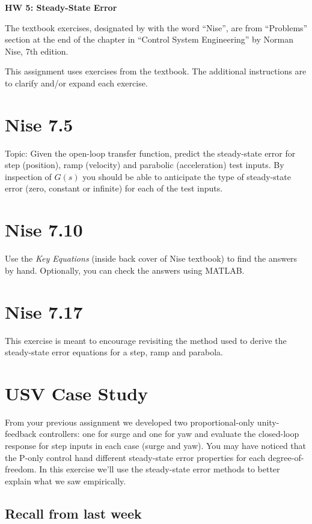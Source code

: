 \documentclass[11pt]{article}
\begin{document}
\begin{center}
  \Large{\bf{HW 5: Steady-State Error}}
\end{center}

The textbook exercises, designated by with the word “Nise”, are from “Problems” section at the end of the chapter in “Control System Engineering” by Norman Nise, 7th edition.

This assignment uses exercises from the textbook.  The additional instructions are to clarify and/or expand each exercise.

\section*{Nise 7.5}
Topic: Given the open-loop transfer function, predict the steady-state error for step (position), ramp (velocity) and parabolic (acceleration) test inputs.  By inspection of $G(s)$ you should be able to anticipate the type of steady-state error (zero, constant or infinite) for each of the test inputs.

\section*{Nise 7.10}

Use the \emph{Key Equations} (inside back cover of Nise textbook) to find the answers by hand. Optionally, you can check the answers using MATLAB.

\section*{Nise 7.17}
This exercise is meant to encourage revisiting the method used to derive the steady-state error equations for a step, ramp and parabola.  

\section{USV Case Study}

From your previous assignment we developed two proportional-only unity-feedback controllers: one for surge and one for yaw and evaluate the closed-loop response for step inputs in each case (surge and yaw).  You may have noticed that the P-only control hand different steady-state error properties for each degree-of-freedom.   In this exercise we'll use the steady-state error methods to better explain what we saw empirically.

\subsection*{Recall from last week}
\end{document}
